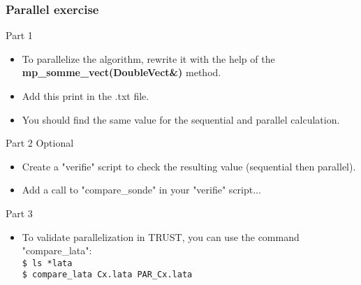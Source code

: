 \documentclass[10pt, hyperref={unicode=true,pdfusetitle, bookmarks=true,bookmarksnumbered=false,bookmarksopen=false, breaklinks=false,pdfborder={0 0 1},backref=true,colorlinks=true,linkcolor=darkblue,pageanchor, urlcolor=darkblue}]{beamer}
\begin{document}
\begin{frame}
\frametitle{Parallel exercise}

\begin{block}{Part 1}
\begin{itemize}
\item To parallelize the algorithm, rewrite it with the help of the \textbf{mp\_somme\_vect(DoubleVect\&)} method.

\item Add this print in the .txt file.

\item You should find the same value for the sequential and parallel calculation.
\end{itemize}
\end{block}

\begin{block}{Part 2 Optional}
\begin{itemize}
\item Create a "verifie" script to check the resulting value (sequential then parallel).

\item Add a call to "compare\_sonde" in your "verifie" script...
\end{itemize}
\end{block}

\begin{block}{Part 3}
\begin{itemize}
\item To validate parallelization in TRUST, you can use the command "compare\_lata":\\
\texttt{\$ ls *lata }\\
\texttt{\$ compare\_lata  Cx.lata  PAR\_Cx.lata }
\end{itemize}
\end{block}

\end{frame}
\end{document}
